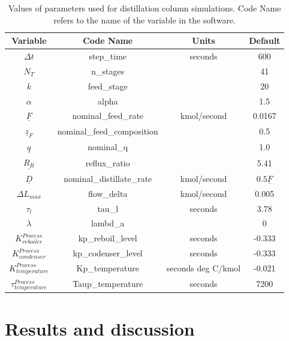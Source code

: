 \begin{table}[bt]
  \begin{tabular}{cccc}
    Variable & Code Name & Units & Default \\
    \hline
    $\Delta t$ & step\_time & seconds & 600  \\
    $N_T$ & n\_stages &  & 41 \\
    $k$ & feed\_stage & & 20  \\
    $\alpha$ & alpha & & 1.5  \\
    $\underline F$ & nominal\_feed\_rate & kmol/second & 0.0167  \\
    $\underline z_F$ & nominal\_feed\_composition & & 0.5   \\
    $\underline q$ & nominal\_q & & 1.0 \\
	$\underline{R_R}$ & reflux\_ratio & & 5.41 \\
	$\underline D$ & nominal\_distillate\_rate & kmol/second  & $0.5 \underline F$ \\
    $\Delta L_{max}$ & flow\_delta & kmol/second  & 0.005  \\
	$\tau_l$ & tau\_l  & seconds & 3.78  \\
	$\lambda$ & lambd\_a & & 0 \\
	$K^{Process}_{reboiler}$ & kp\_reboil\_level & seconds & -0.333  \\
	$K^{Process}_{condenser}$ & kp\_codenser\_level & seconds &  -0.333\\
	$K^{Process}_{temperature}$ & Kp\_temperature & seconds deg C/kmol & -0.021 \\
	$\tau^{Process}_{temperature}$ & Taup\_temperature & seconds & 7200 \\
  \end{tabular}
  \caption{Values of parameters used for distillation column simulations. Code Name refers to the name of the variable in the software.}
  \label{parameters_table}
\end{table}


\section{Results and discussion}

